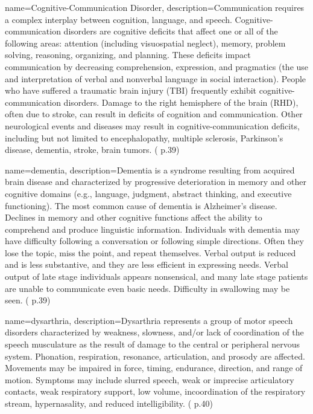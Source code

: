  {
	name={Cognitive-Communication Disorder}, 
	description={Communication requires a complex interplay between cognition, language, and speech. Cognitive-communication disorders are cognitive deficits that affect one or all of the following areas: attention (including visuospatial neglect), memory, problem solving, reasoning, organizing, and planning. These deficits impact communication by decreasing comprehension, expression, and pragmatics (the use and interpretation of verbal and nonverbal language in social interaction). People who have suffered a traumatic brain injury (TBI) frequently exhibit cognitive-communication disorders. Damage to the right hemisphere of the brain (RHD), often due to stroke, can result in deficits of cognition and communication. Other neurological events and diseases may result in cognitive-communication deficits, including but not limited to encephalopathy, multiple sclerosis, Parkinson’s disease, dementia, stroke, brain tumors. (\cite{SLPathologies} p.39)
}
}

 {
	name={dementia}, 
	description={Dementia is a syndrome resulting from acquired brain disease and characterized by progressive deterioration in memory and other cognitive domains (e.g., language, judgment, abstract thinking, and executive functioning). The most common cause of dementia is Alzheimer's disease. Declines in memory and other cognitive functions affect the ability to comprehend and produce linguistic information. Individuals with dementia may have difficulty following a conversation or following simple directions. Often they lose the topic, miss the point, and repeat themselves. Verbal output is reduced and is less substantive, and they are less efficient in expressing needs. Verbal output of late stage individuals appears nonsensical, and many late stage patients are unable to communicate even basic needs. Difficulty in swallowing may be seen. (\cite{SLPathologies} p.39)
}
}

 {
	name={dysarthria}, 
	description={Dysarthria represents a group of motor speech disorders characterized by weakness, slowness, and/or lack of coordination of the speech musculature as the result of damage to the central or peripheral nervous system. Phonation, respiration, resonance, articulation, and prosody are affected. Movements may be impaired in force, timing, endurance, direction, and range of motion. Symptoms may include slurred speech, weak or imprecise articulatory contacts, weak respiratory support, low volume, incoordination of the respiratory stream, hypernasality, and reduced intelligibility. (\cite{SLPathologies} p.40)
}
}

